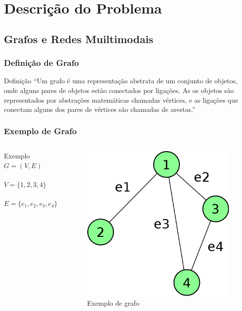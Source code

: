 \section{Descrição do Problema}

\subsection{Grafos e Redes Muiltimodais}

\frame
{
\frametitle{Definição de Grafo}
\begin{block}{Definição}
``Um grafo é uma representação abstrata de um conjunto de objetos, onde alguns pares de objetos estão conectados por ligações.
As os objetos são representados por abstrações matemáticas chamadas vértices, e as ligações que conectam alguns dos pares de vértices são chamadas de arestas.''
\end{block}
}

\frame
{
\frametitle{Exemplo de Grafo}
\begin{columns}[c]
\column{1.5in}
	\begin{exampleblock}{Exemplo}
		$G = (V,E)$ \\
		$ $ \\
		$V = \{1,2,3,4\}$ \\
		$ $ \\
		$E = \{e_1,e_2,e_3,e_4\}$ 
	\end{exampleblock}
\column{1.5in}
	\begin{figure}
		\includegraphics[width=\textwidth]{./imgs/grafo.png}
		\caption{Exemplo de grafo}
	\end{figure}
\end{columns}
}

